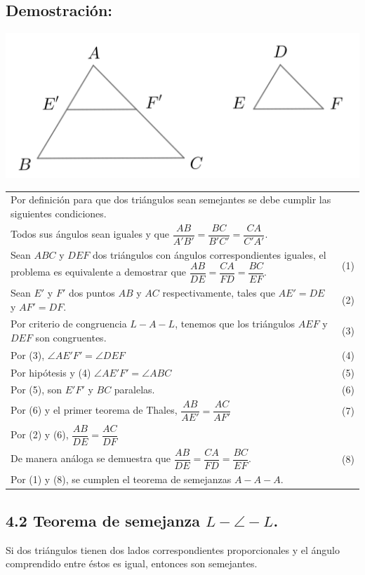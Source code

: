 \documentclass[12pt,a4paper]{article}
\begin{document}
\subsection*{Demostración:}
\begin{center}
\includegraphics[scale=0.8]{semejanza.png} 
\end{center}
\begin{tabular}{p{15.9 cm} p{1cm}}
Por definición para que dos triángulos sean semejantes se debe cumplir las siguientes condiciones.
\\Todos sus ángulos sean iguales y que $\dfrac{AB}{A'B'}=\dfrac{BC}{B'C'}=\dfrac{CA}{C'A'}.$ 
\\Sean $ABC$ y $DEF$ dos triángulos con ángulos correspondientes iguales, el problema es equivalente a demostrar que $\dfrac{AB}{DE}=\dfrac{CA}{FD}=\dfrac{BC}{EF}.$&\medskip (1)
\\Sean $E'$ y $F'$ dos puntos $AB$ y $AC$ respectivamente, tales que $AE'= DE$ y $AF' = DF$. &(2)
\\Por criterio de congruencia $L-A-L$, tenemos que los triángulos $AEF$ y $DEF$ son congruentes.&(3)
\\Por (3), $\angle AE'F' = \angle DEF $ & (4)
\\Por hipótesis y (4) $\angle AE'F'=\angle ABC$ & (5)
\\Por (5), son $E'F'$ y $BC$ paralelas. & (6)
\\Por (6) y el primer teorema de Thales, $\dfrac{AB}{AE'}=\dfrac{AC}{AF'}$ & (7)
\\Por (2) y (6), $\dfrac{AB}{DE}=\dfrac{AC}{DF}$
\\De manera análoga se demuestra que $\dfrac{AB}{DE}=\dfrac{CA}{FD}=\dfrac{BC}{EF}.$ & (8)
\\Por (1) y (8), se cumplen el teorema de semejanzas $A-A-A$.
\end{tabular}
\subsection*{4.2 Teorema de semejanza $L- \angle -L$.}
Si dos triángulos tienen dos lados correspondientes proporcionales y el ángulo comprendido entre éstos es igual, entonces son semejantes.
\end{document}
